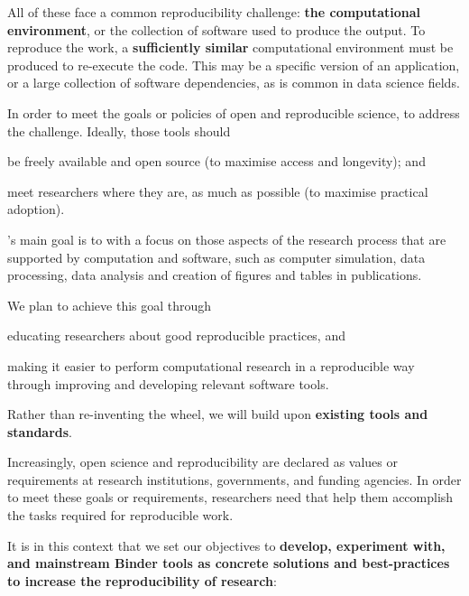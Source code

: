 All of these face a common reproducibility challenge: \textbf{the computational environment},
or the collection of software used to produce the output.
To reproduce the work, a \textbf{sufficiently similar} computational environment must be produced to re-execute the code.
This may be a specific version of an application, or a large collection of software dependencies,
as is common in data science fields.

In order to meet the goals or policies of open and reproducible science,
 to address the challenge. Ideally, those tools should
\begin{compactitem}
\item be freely available and open source (to maximise access and longevity); and
\item meet researchers where they are, as much as possible (to maximise practical adoption).
\end{compactitem}

\TheProject's main goal is to  with a focus on those aspects of the research process that
are supported by computation and software, such as computer simulation, data
processing, data analysis and creation of figures and tables in publications.

We plan to achieve this goal through
\begin{compactitem}
\item educating researchers about good reproducible practices, and
\item making it easier to perform computational research in a reproducible way
  through improving and developing relevant software tools.
\end{compactitem}

Rather than re-inventing the wheel, we will build upon \textbf{existing tools and standards}.

Increasingly, open science and reproducibility are declared as values or requirements
at research institutions, governments, and funding agencies.
In order to meet these goals or requirements,
researchers need  that help them accomplish the tasks required for reproducible work.

It is in this context that we set our objectives to \textbf{develop, experiment with, and mainstream Binder tools as concrete solutions and best-practices to increase the reproducibility of research}:

